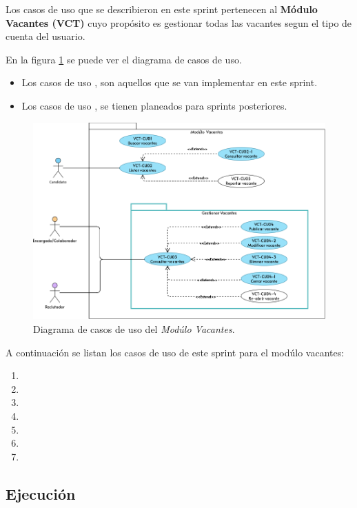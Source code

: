Los casos de uso que se describieron en este sprint pertenecen al \textbf{Módulo Vacantes (VCT)} cuyo propósito es gestionar
todas las vacantes segun el tipo de cuenta del usuario.

En la figura \ref{dcu:MUVCT} se puede ver el diagrama de casos de uso.
\begin{itemize}
    \item Los casos de uso \IUazul{} , son aquellos que se van implementar en este sprint.
    \item Los casos de uso \IUblanco{}, se tienen planeados para sprints posteriores.
\end{itemize} 

\begin{figure}[H]
    \begin{center}
        \includegraphics[width=.7\textwidth]{sprints/imagenes/MUVCT.png}
    \end{center}
    \caption{Diagrama de casos de uso del \textit{Modúlo Vacantes}.}
    \label{dcu:MUVCT}
\end{figure}

A continuación se listan los casos de uso de este sprint para el modúlo vacantes:
\begin{enumerate}
    \item {}
    \item {} 
    \item {} 
    \item {}
    \item {}
    \item {} 
    \item {} 
\end{enumerate} 

\subsection{Ejecución}

